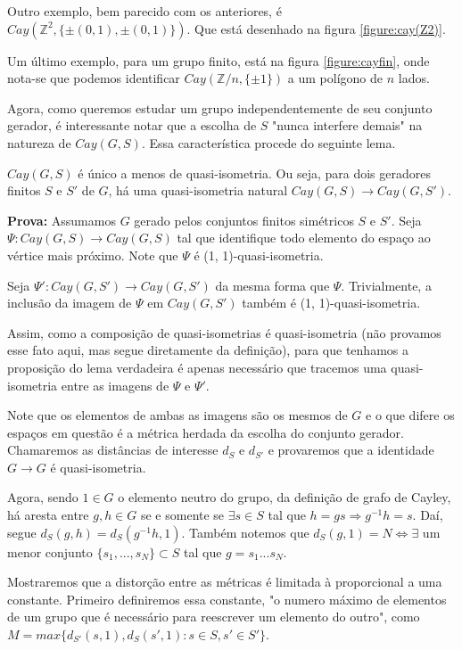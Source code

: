 Outro exemplo, bem parecido com os anteriores, é $Cay(\mathbb{Z}^2, \{\pm(0, 1), \pm(0, 1) \})$. Que está desenhado na figura \ref{figure:cay(Z2)}.



Um último exemplo, para um grupo finito, está na figura \ref{figure:cayfin}, onde nota-se que podemos identificar $Cay(\mathbb{Z}/n, \{\pm1 \})$ a um polígono de $n$ lados.



Agora, como queremos estudar um grupo independentemente de seu conjunto gerador, é interessante notar que a escolha de $S$ "nunca interfere demais" na natureza de $Cay(G,S)$. Essa característica procede do seguinte lema.

\begin{lemma}
$Cay(G,S)$ é único a menos de quasi-isometria. Ou seja, para dois geradores finitos $S$ e $S'$ de $G$, há uma quasi-isometria natural $Cay(G,S) \rightarrow Cay(G,S')$.

\textbf{Prova:} Assumamos $G$ gerado pelos conjuntos finitos simétricos $S$ e $S'$. Seja $\Psi: Cay(G,S) \rightarrow Cay(G,S)$ tal que identifique todo elemento do espaço ao vértice mais próximo. Note que $\Psi$ é (1, 1)-quasi-isometria.

Seja $\Psi': Cay(G,S') \rightarrow Cay(G,S')$ da mesma forma que $\Psi$. Trivialmente, a inclusão da imagem de $\Psi$ em $Cay(G,S')$ também é (1, 1)-quasi-isometria.

Assim, como a composição de quasi-isometrias é quasi-isometria (não provamos esse fato aqui, mas segue diretamente da definição), para que tenhamos a proposição do lema verdadeira é apenas necessário que tracemos uma quasi-isometria entre as imagens de $\Psi$ e $\Psi'$.

Note que os elementos de ambas as imagens são os mesmos de $G$ e o que difere os espaços em questão é a métrica herdada da escolha do conjunto gerador. Chamaremos as distâncias de interesse $d_S$ e $d_{S'}$ e provaremos que a identidade $G \rightarrow G$ é quasi-isometria.

Agora, sendo $1 \in G$ o elemento neutro do grupo, da definição de grafo de Cayley, há aresta entre $g, h \in G$ se e somente se $\exists s \in S$ tal que $h=gs \Rightarrow g^{-1}h = s$. Daí, segue $d_S(g, h) = d_S(g^{-1}h, 1)$. Também notemos que $d_S(g, 1) = N \iff \exists$ um menor conjunto $\{s_1, ..., s_N\} \subset S$ tal que $g = s_1 ... s_N$.

Mostraremos que a distorção entre as métricas é limitada à proporcional a uma constante. Primeiro definiremos essa constante, "o numero máximo de elementos de um grupo que é necessário para reescrever um elemento do outro", como $M = max\{d_{S'}(s,1), d_{S}(s',1) : s \in S, s' \in S'\}$.


\end{lemma}
